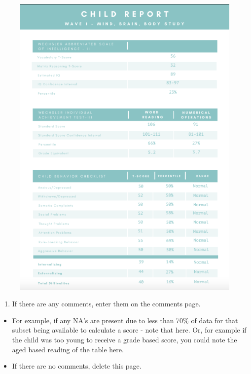 \documentclass[]{book}
\providecommand{\tightlist}{%
  \setlength{\itemsep}{0pt}\setlength{\parskip}{0pt}}
\begin{document}
\begin{figure}
\centering
\includegraphics{images/final_checklist/report_cards/5.png}
\caption{}
\end{figure}

\begin{enumerate}
\def\labelenumi{\arabic{enumi}.}
\setcounter{enumi}{5}
\tightlist
\item
  If there are any comments, enter them on the comments page.
\end{enumerate}

\begin{itemize}
\item
  For example, if any NA's are present due to less than 70\% of data for that subset being available to calculate a score - note that here. Or, for example if the child was too young to receive a grade based score, you could note the aged based reading of the table here.
\item
  If there are no comments, delete this page.
\end{itemize}
\end{document}
